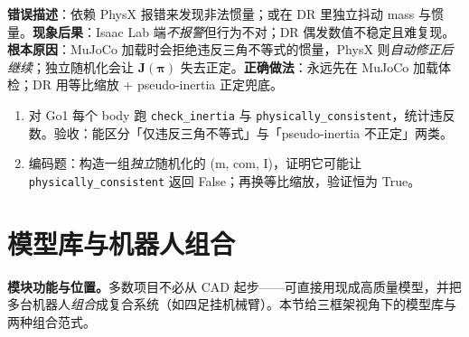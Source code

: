 \noindent{}

\begin{pitfall}
\textbf{错误描述}：依赖 PhysX 报错来发现非法惯量；或在 DR 里独立抖动 mass 与惯量。\textbf{现象后果}：Isaac Lab 端\emph{不报警}但行为不对；DR 偶发数值不稳定且难复现。\textbf{根本原因}：MuJoCo 加载时会拒绝违反三角不等式的惯量，PhysX 则\emph{自动修正后继续}；独立随机化会让 $\mathbf{J}(\boldsymbol\pi)$ 失去正定。\textbf{正确做法}：永远先在 MuJoCo 加载体检；DR 用等比缩放 + pseudo-inertia 正定兜底。
\end{pitfall}

\begin{practice}[动手：惯性体检与一致随机化]
\begin{enumerate}
  \item 对 Go1 每个 body 跑 \texttt{check\_inertia} 与 \texttt{physically\_consistent}，统计违反数。验收：能区分「仅违反三角不等式」与「pseudo-inertia 不正定」两类。
  \item 编码题：构造一组\emph{独立}随机化的 (m, com, I)，证明它可能让 \texttt{physically\_consistent} 返回 False；再换等比缩放，验证恒为 True。
\end{enumerate}
\end{practice}

\section{模型库与机器人组合}
\label{sec:rlmc-assets-zoo}

\textbf{模块功能与位置。}多数项目不必从 CAD 起步——可直接用现成高质量模型，并把多台机器人\emph{组合}成复合系统（如四足挂机械臂）。本节给三框架视角下的模型库与两种组合范式。

